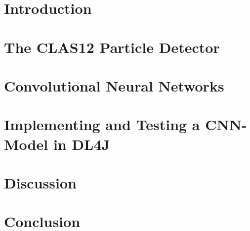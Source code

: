 \documentclass[a4paper, english]{scrreprt}
\begin{document}




\onehalfspacing


\setcounter{tocdepth}{3}
\setcounter{secnumdepth}{3}
\tableofcontents

\chapter{Introduction}

\chapter{The CLAS12 Particle Detector}



\chapter{Convolutional Neural Networks}

\chapter{Implementing and Testing a CNN-Model in DL4J}

\chapter{Discussion}

\chapter{Conclusion}

\printbibliography

\listoffigures
\end{document}
